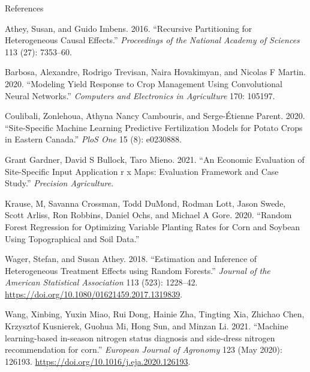 \documentclass[
  12pt,
  ignorenonframetext,
  aspectratio=169,
]{beamer}
\newlength{\cslhangindent}
\newlength{\cslentryspacingunit} %
\newenvironment{CSLReferences}[2] %
 {%
  \setlength{\parindent}{0pt}
  \ifodd #1
  \let\oldpar\par
  \def\par{\hangindent=\cslhangindent\oldpar}
  \fi
  \setlength{\parskip}{#2\cslentryspacingunit}
 }%
 {}
\begin{document}
\begin{frame}[allowframebreaks]{References}
\protect\hypertarget{references}{}
\hypertarget{refs}{}
\begin{CSLReferences}{1}{0}
\leavevmode{}%
Athey, Susan, and Guido Imbens. 2016. {``Recursive Partitioning for
Heterogeneous Causal Effects.''} \emph{Proceedings of the National
Academy of Sciences} 113 (27): 7353--60.

\leavevmode{}%
Barbosa, Alexandre, Rodrigo Trevisan, Naira Hovakimyan, and Nicolas F
Martin. 2020. {``Modeling Yield Response to Crop Management Using
Convolutional Neural Networks.''} \emph{Computers and Electronics in
Agriculture} 170: 105197.

\leavevmode{}%
Coulibali, Zonlehoua, Athyna Nancy Cambouris, and Serge-Étienne Parent.
2020. {``Site-Specific Machine Learning Predictive Fertilization Models
for Potato Crops in Eastern Canada.''} \emph{PloS One} 15 (8): e0230888.

\leavevmode{}%
Grant Gardner, David S Bullock, Taro Mieno. 2021. {``An Economic
Evaluation of Site-Specific Input Application r x Maps: Evaluation
Framework and Case Study.''} \emph{Precision Agriculture}.

\leavevmode{}%
Krause, M, Savanna Crossman, Todd DuMond, Rodman Lott, Jason Swede,
Scott Arliss, Ron Robbins, Daniel Ochs, and Michael A Gore. 2020.
{``Random Forest Regression for Optimizing Variable Planting Rates for
Corn and Soybean Using Topographical and Soil Data.''}

\leavevmode{}%
Wager, Stefan, and Susan Athey. 2018. {``{Estimation and Inference of
Heterogeneous Treatment Effects using Random Forests}.''} \emph{Journal
of the American Statistical Association} 113 (523): 1228--42.
\url{https://doi.org/10.1080/01621459.2017.1319839}.

\leavevmode{}%
Wang, Xinbing, Yuxin Miao, Rui Dong, Hainie Zha, Tingting Xia, Zhichao
Chen, Krzysztof Kusnierek, Guohua Mi, Hong Sun, and Minzan Li. 2021.
{``{Machine learning-based in-season nitrogen status diagnosis and
side-dress nitrogen recommendation for corn}.''} \emph{European Journal
of Agronomy} 123 (May 2020): 126193.
\url{https://doi.org/10.1016/j.eja.2020.126193}.

\end{CSLReferences}
\end{frame}
\end{document}
